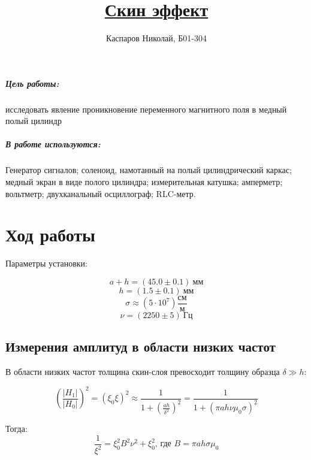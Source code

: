 \documentclass[a4paper]{article}
\title{\underline{Скин эффект}}
\author{Каспаров Николай, Б01-304}
\begin{document}
\maketitle
\begin{center}
\Large{\textbf{ }}
\end{center}

\subparagraph{Цель работы:}

    исследовать явление проникновение переменного магнитного поля в медный полый цилиндр

\subparagraph{В работе используются:}

Генератор сигналов; соленоид, намотанный на полый цилиндрический каркас;
медный экран в виде полого цилиндра; измерительная катушка; амперметр; вольтметр;
двухканальный осциллограф; RLC-метр.

\section{Ход работы}

Параметры установки:

\begin{equation*}
    a + h = (45.0 \pm 0.1) ~ \text{мм}
\end{equation*}
\begin{equation*}
    h = (1.5 \pm 0.1) ~ \text{мм}
\end{equation*}
\begin{equation*}
    \sigma \approx (5 \cdot 10^7) \frac{\text{см}}{\text{м}}
\end{equation*}
\begin{equation*}
    \nu = (2250 \pm 5) ~ \text{Гц}
\end{equation*}

\subsection{Измерения амплитуд в области низких частот}

В области низких частот толщина скин-слоя превосходит толщину образца $\delta \gg h$:

\begin{equation}
    \left(\frac{|H_1|}{|H_0|}\right)^2 = (\xi_0\xi)^2 \approx \frac{1}{1+\left(\frac{ah}{\delta^2}\right)^2} = \frac{1}{1 + \left(\pi ah\nu\mu_0\sigma\right)^2}
\end{equation}

Тогда: 
\begin{equation}
    \frac{1}{\xi^2}=\xi_0^2B^2\nu^2 + \xi_0^2 \text{, где } B=\pi a h \sigma \mu_0
\end{equation}
\end{document}
